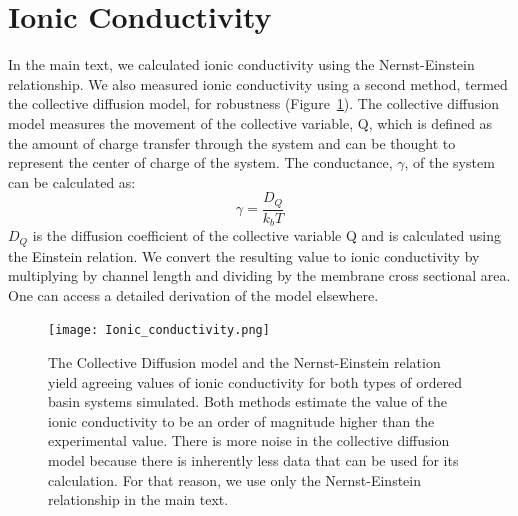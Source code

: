 \documentclass{article}
\begin{document}


  
  \section{Ionic Conductivity}\label{section:ionic_conductivity}
  In the main text, we calculated ionic conductivity using the Nernst-Einstein
  relationship. We also measured ionic conductivity using a second method, termed
  the collective diffusion model\cite{liu_collective_2013}, for robustness
  (Figure~\ref{fig:conductivity}). The collective diffusion model measures the
  movement of the collective variable, Q, which is defined as the amount of
  charge transfer through the system and can be thought to represent the center
  of charge of the system. The conductance, $\gamma$, of the system can be
  calculated as:
  \begin{equation}
	 \gamma = \dfrac{D_Q}{k_b T} 
	\label{eqn:collective_diffusion}
  \end{equation}
  $D_Q$ is the diffusion coefficient of the collective variable Q and is 
  calculated using the Einstein relation. We convert the resulting value
  to ionic conductivity by multiplying by channel length and dividing by
  the membrane cross sectional area. One can access a detailed derivation of 
  the model elsewhere\cite{liu_collective_2013}.
  
  \begin{figure}[!htb]
        \centering
        \texttt{[image: Ionic\_conductivity.png]}
        \caption{The Collective Diffusion model and the Nernst-Einstein relation yield
        agreeing values of ionic conductivity for both types of ordered basin systems 
        simulated. Both methods estimate the value of the ionic conductivity to be an 
        order of magnitude higher than the experimental value. There is more noise in
        the collective diffusion model because there is inherently less data that 
        can be used for its calculation. For that reason, we use only the Nernst-Einstein relationship in the main text.}
        \label{fig:conductivity}
  \end{figure}  
  
\end{document}
